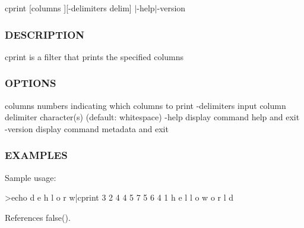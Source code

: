 cprint \mbox{[}columns \mbox{]}\mbox{[}-\/delimiters delim\mbox{]} $\vert$-\/help$\vert$-\/version

\subsubsection*{D\+E\+S\+C\+R\+I\+P\+T\+I\+ON}

cprint is a filter that prints the specified columns

\subsubsection*{O\+P\+T\+I\+O\+NS}

columns numbers indicating which columns to print -\/delimiters input column delimiter character(s) (default\+: whitespace) -\/help display command help and exit -\/version display command metadata and exit \subsubsection*{E\+X\+A\+M\+P\+L\+ES}

Sample usage\+: \begin{DoxyVerb}>echo d e h l o r w|cprint 3 2 4 4 5 7 5 6 4 1
h e l l o w o r l d \end{DoxyVerb}
 

References false().

